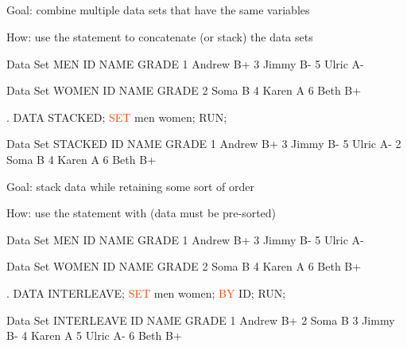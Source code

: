\subsection{}
\begin{frame}[fragile]
\bi
\item[Goal:] combine multiple data sets that have the same variables
\item[How:] use the  statement to concatenate (or stack) the data sets
\ei
{}
\footnotesize
\begin{craw}{.1}{Data Set MEN}
ID   NAME     GRADE
1    Andrew     B+
3    Jimmy      B-
5    Ulric      A-
\end{craw}
\vspace{.0in}
\begin{craw}{.1}{Data Set WOMEN}
ID   NAME     GRADE
2    Soma       B
4    Karen      A
6    Beth       B+
\end{craw}
\vspace{.0in}
\emp
{}
\begin{code}{.}
DATA STACKED;
   \textcolor{OrangeRed}{SET} men women;
RUN;
\end{code}
\vspace{.0in}
\begin{craw}{.1}{Data Set STACKED}
ID   NAME     GRADE
1    Andrew     B+
3    Jimmy      B-
5    Ulric      A-
2    Soma       B
4    Karen      A
6    Beth       B+
\end{craw}
\emp
\vspace{.0in}
\end{frame}

\begin{frame}[fragile]
\bi
\item[Goal:] stack data while retaining some sort of order
\item[How:] use the  statement with  (data must be pre-sorted)
\ei
{}
\footnotesize
\begin{craw}{.1}{Data Set MEN}
ID   NAME     GRADE
1    Andrew     B+
3    Jimmy      B-
5    Ulric      A-
\end{craw}
\vspace{.0in}
\begin{craw}{.1}{Data Set WOMEN}
ID   NAME     GRADE
2    Soma       B
4    Karen      A
6    Beth       B+
\end{craw}
\vspace{.0in}
\emp
{}
\begin{code}{.}
DATA INTERLEAVE;
   \textcolor{OrangeRed}{SET} men women;
   \textcolor{OrangeRed}{BY} ID;
RUN;
\end{code}
\vspace{.0in}
\begin{craw}{.1}{Data Set INTERLEAVE}
ID   NAME     GRADE
1    Andrew     B+
2    Soma       B
3    Jimmy      B-
4    Karen      A
5    Ulric      A-
6    Beth       B+
\end{craw}
\emp
\vspace{.0in}
\end{frame}

